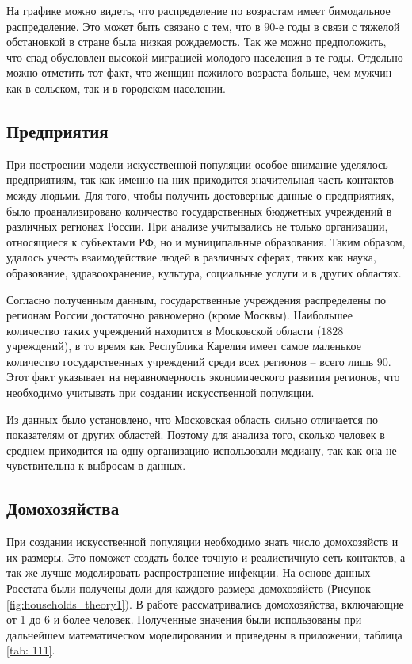 \documentclass[14pt,a4paper]{article}
\begin{document}
На графике можно видеть, что распределение по возрастам имеет бимодальное распределение. Это может быть связано с тем, что в $90$-е годы в связи с тяжелой обстановкой в стране была низкая рождаемость. Так же можно предположить, что спад обусловлен высокой миграцией молодого населения в те годы. Отдельно можно отметить тот факт, что женщин пожилого возраста больше, чем мужчин как в сельском, так и в городском населении.







\subsection{Предприятия}\label{3}


При построении модели искусственной популяции особое внимание уделялось предприятиям, так как именно на них приходится значительная часть контактов между людьми. Для того, чтобы получить достоверные данные о предприятиях, было проанализировано количество государственных бюджетных учреждений в различных регионах России. При анализе учитывались не только организации, относящиеся к  субъектами РФ, но и муниципальные образования. Таким образом, удалось учесть взаимодействие людей в различных сферах, таких как наука, образование, здравоохранение, культура, социальные услуги и в других областях.


Согласно полученным данным, государственные учреждения распределены по регионам России достаточно равномерно (кроме Москвы). Наибольшее количество таких учреждений находится в Московской области ($1828$ учреждений), в то время как Республика Карелия имеет самое маленькое количество государственных учреждений среди всех регионов -- всего лишь $90$. Этот факт указывает на неравномерность экономического развития регионов, что необходимо учитывать при создании искусственной популяции.

Из данных было установлено, что Московская область сильно отличается по показателям от других областей. Поэтому для анализа того, сколько человек в среднем приходится на одну организацию использовали медиану, так как она не чувствительна к выбросам в данных. 


\subsection{Домохозяйства}\label{5}

При создании искусственной популяции необходимо знать число домохозяйств и их размеры. Это поможет создать более точную и реалистичную сеть контактов, а так же лучше моделировать распространение инфекции. На основе данных Росстата  \cite{rosstat} были получены доли для каждого размера домохозяйств (Рисунок \ref{fig:households_theory1}). В работе рассматривались домохозяйства, включающие от 1 до 6 и более человек. Полученные значения были использованы при дальнейшем математическом моделировании и приведены в приложении, таблица \ref{tab: 111}. 
\end{document}
